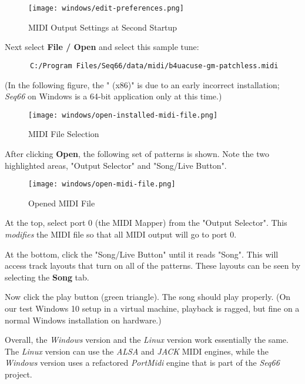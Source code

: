 \begin{figure}[H]
   \centering 
   \texttt{[image: windows/edit-preferences.png]}
   \caption{MIDI Output Settings at Second Startup}
   \label{fig:windows_output_settings_second_startup}
\end{figure}

   Next select \textbf{File / Open} and select this sample tune:

   \begin{verbatim}
      C:/Program Files/Seq66/data/midi/b4uacuse-gm-patchless.midi
   \end{verbatim}

   (In the following figure, the " (x86)" is due to an early incorrect
   installation; \textsl{Seq66} on Windows is a 64-bit application only
   at this time.)

\begin{figure}[H]
   \centering 
   \texttt{[image: windows/open-installed-midi-file.png]}
   \caption{MIDI File Selection}
   \label{fig:windows_open_installed_midi_file}
\end{figure}

   After clicking \textbf{Open}, the following set of patterns is shown.
   Note the two highlighted areas, "Output Selector" and "Song/Live Button".

\begin{figure}[H]
   \centering 
   \texttt{[image: windows/open-midi-file.png]}
   \caption{Opened MIDI File}
   \label{fig:windows_open_midi_file}
\end{figure}

   At the top, select port 0 (the MIDI Mapper) from the "Output Selector".
   This \textsl{modifies} the MIDI file so that all MIDI
   output will go to port 0.

   At the bottom, click the "Song/Live Button" until it reads "Song".
   This will access track layouts that turn on all of the patterns.
   These layouts can be seen by selecting the \textbf{Song} tab.

   Now click the play button (green triangle).
   The song should play properly.
   (On our test Windows 10 setup in a virtual machine, playback is ragged,
   but fine on a normal Windows installation on hardware.)

   Overall, the \textsl{Windows} version and the \textsl{Linux} version
   work essentially the same. The \textsl{Linux} version can use the
   \textsl{ALSA} and \textsl{JACK} MIDI engines, while the \textsl{Windows}
   version uses a refactored \textsl{PortMidi} engine that is part of the
   \textsl{Seq66} project.


